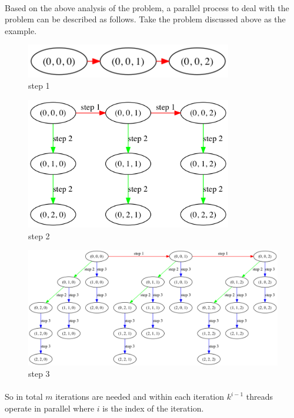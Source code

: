 \documentclass[11pt,reqno]{article}
\begin{document}
        \paragraph{} Based on the above analysis of the problem, a parallel process to deal with the problem can be described as follows. Take the problem discussed above as the example. 
        \begin{figure}[ht]
                \centering
                \includegraphics[width = 90mm]{traversal1.png}
                \caption{step 1}
        \end{figure}
        \begin{figure}[ht]
                \centering
                \includegraphics[width = 90mm]{traversal2.png}
                \caption{step 2}
        \end{figure}
        \begin{figure}[ht]
                \centering
                \includegraphics[width = 180mm]{traversal3.png}
                \caption{step 3}
        \end{figure}

        \paragraph{} So in total $m$ iterations are needed and within each iteration $k ^{i - 1}$ threads operate in parallel where $i$ is the index of the iteration.  
\end{document}
